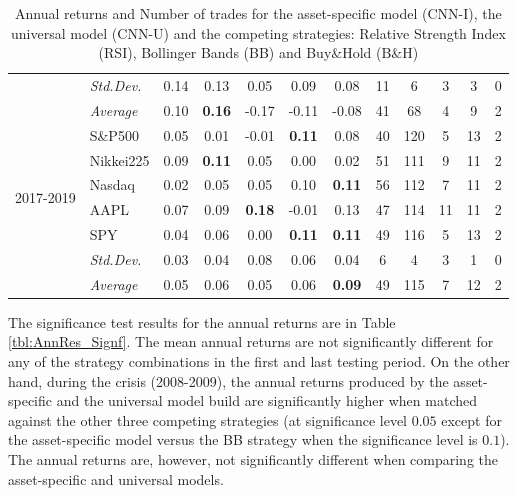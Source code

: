 \documentclass[11pt, a4paper]{article}
\begin{document}
\begin{table}[H]
\begin{tabular}{l|l|ccccc|ccccc}
 & \textit{Std.Dev.} & 0.14 & 0.13 & 0.05  & 0.09  & 0.08  & 11 & 6  & 3 & 3  & 0 \\ \cline{2-12} 
 & \textit{Average}  & 0.10 & \textbf{0.16} & -0.17 & -0.11 & -0.08 & 41 & 68 & 4 & 9  & 2 \\ \hline
\multirow{6}{1cm}{2017-2019} & S\&P500       & 0.05          & 0.01          & -0.01         & \textbf{0.11} & 0.08          & 40               & 120   & 5   & 13 & 2    \\
  & Nikkei225     & 0.09          & \textbf{0.11} & 0.05          & 0.00          & 0.02          & 51               & 111   & 9   & 11 & 2    \\
  & Nasdaq         & 0.02          & 0.05          & 0.05          & 0.10          & \textbf{0.11} & 56               & 112   & 7   & 11 & 2    \\
  & AAPL      & 0.07          & 0.09          & \textbf{0.18} & -0.01         & 0.13          & 47               & 114   & 11  & 11 & 2    \\
  & SPY       & 0.04          & 0.06          & 0.00          & \textbf{0.11} & \textbf{0.11} & 49               & 116   & 5   & 13 & 2    \\ 
  \cline{2-12}
  & \textit{Std.Dev.}  & 0.03 & 0.04 & 0.08 & 0.06 & 0.04 & 6 & 4 & 3 & 1 & 0\\
  \cline{2-12}
  & \textit{Average} & 0.05          & 0.06          & 0.05          & 0.06          & \textbf{0.09} & 49               & 115   & 7   & 12 & 2   
\end{tabular}
\caption{Annual returns and Number of trades for the asset-specific model (CNN-I), the universal model (CNN-U) and the competing strategies: Relative Strength Index (RSI), Bollinger Bands (BB) and Buy\&Hold (B\&H)}
\label{tbl:FinResMain}
\end{table}

The significance test results for the annual returns are in Table \ref{tbl:AnnRes_Signf}. The mean annual returns are not significantly different for any of the strategy combinations in the first and last testing period. On the other hand, during the crisis (2008-2009), the annual returns produced by the asset-specific and the universal model build are significantly higher when matched against the other three competing strategies (at significance level $0.05$ except for the asset-specific model versus the BB strategy when the significance level is $0.1$). The annual returns are, however, not significantly different when comparing the asset-specific and universal models.
\end{document}
